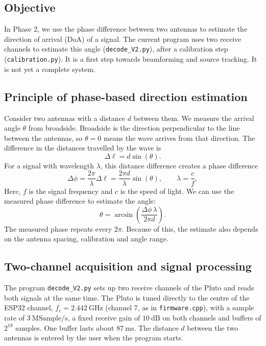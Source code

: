 \subsection{Objective}

In Phase 2, we use the phase difference between two antennas to estimate the
direction of arrival (DoA) of a signal. The current program uses two receive
channels to estimate this angle (\texttt{decode\_V2.py}), after a calibration
step (\texttt{calibration.py}). It is a first step
towards beamforming and source tracking. It is not yet a complete system.

\subsection{Principle of phase-based direction estimation}

Consider two antennas with a distance \(d\) between them. We measure the
arrival angle \(\theta\) from broadside. Broadside is the direction
perpendicular to the line between the antennas, so \(\theta=0\) means the
wave arrives from that direction. The difference in the distances travelled
by the wave is
\[
    \Delta \ell = d\sin(\theta).
\]
For a signal with wavelength \(\lambda\), this distance difference creates a
phase difference
\[
    \Delta\phi
    = \frac{2\pi}{\lambda}\Delta\ell
    = \frac{2\pi d}{\lambda}\sin(\theta),
    \qquad
    \lambda = \frac{c}{f},
\]
Here, \(f\) is the signal frequency and \(c\) is the speed of light. We can
use the measured phase difference to estimate the angle:
\[
    \theta
    = \arcsin\!\left(\frac{\Delta\phi\,\lambda}{2\pi d}\right).
\]
The measured phase repeats every \(2\pi\). Because of this, the estimate also
depends on the antenna spacing, calibration and angle range.

\subsection{Two-channel acquisition and signal processing}

The program \texttt{decode\_V2.py} sets up two receive channels of the Pluto
and reads both signals at the same time. The Pluto is tuned directly to the
centre of the ESP32 channel, \(f_c = 2.442~\mathrm{GHz}\) (channel 7, as in
\texttt{firmware.cpp}), with a sample rate of \(3~\mathrm{MSample/s}\), a
fixed receive gain of \(10~\mathrm{dB}\) on both channels and buffers of
\(2^{18}\) samples. One buffer lasts about \(87~\mathrm{ms}\). The distance
\(d\) between the two antennas is entered by the user when the program
starts.

